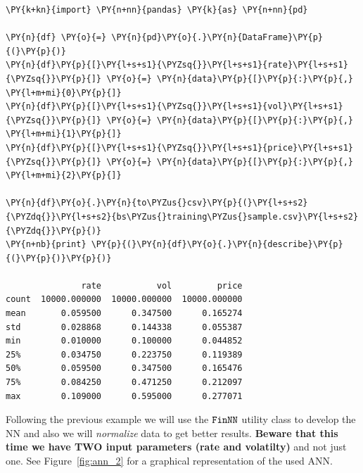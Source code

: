 \begin{tcolorbox}[breakable, size=fbox, boxrule=1pt, pad at break*=1mm,colback=cellbackground, colframe=cellborder]
\begin{Verbatim}[commandchars=\\\{\}]
\PY{k+kn}{import} \PY{n+nn}{pandas} \PY{k}{as} \PY{n+nn}{pd}
	
\PY{n}{df} \PY{o}{=} \PY{n}{pd}\PY{o}{.}\PY{n}{DataFrame}\PY{p}{(}\PY{p}{)}
\PY{n}{df}\PY{p}{[}\PY{l+s+s1}{\PYZsq{}}\PY{l+s+s1}{rate}\PY{l+s+s1}{\PYZsq{}}\PY{p}{]} \PY{o}{=} \PY{n}{data}\PY{p}{[}\PY{p}{:}\PY{p}{,} \PY{l+m+mi}{0}\PY{p}{]}
\PY{n}{df}\PY{p}{[}\PY{l+s+s1}{\PYZsq{}}\PY{l+s+s1}{vol}\PY{l+s+s1}{\PYZsq{}}\PY{p}{]} \PY{o}{=} \PY{n}{data}\PY{p}{[}\PY{p}{:}\PY{p}{,} \PY{l+m+mi}{1}\PY{p}{]}
\PY{n}{df}\PY{p}{[}\PY{l+s+s1}{\PYZsq{}}\PY{l+s+s1}{price}\PY{l+s+s1}{\PYZsq{}}\PY{p}{]} \PY{o}{=} \PY{n}{data}\PY{p}{[}\PY{p}{:}\PY{p}{,} \PY{l+m+mi}{2}\PY{p}{]}
	
\PY{n}{df}\PY{o}{.}\PY{n}{to\PYZus{}csv}\PY{p}{(}\PY{l+s+s2}{\PYZdq{}}\PY{l+s+s2}{bs\PYZus{}training\PYZus{}sample.csv}\PY{l+s+s2}{\PYZdq{}}\PY{p}{)}
\PY{n+nb}{print} \PY{p}{(}\PY{n}{df}\PY{o}{.}\PY{n}{describe}\PY{p}{(}\PY{p}{)}\PY{p}{)}

               rate           vol         price
count  10000.000000  10000.000000  10000.000000
mean       0.059500      0.347500      0.165274
std        0.028868      0.144338      0.055387
min        0.010000      0.100000      0.044852
25%        0.034750      0.223750      0.119389
50%        0.059500      0.347500      0.165476
75%        0.084250      0.471250      0.212097
max        0.109000      0.595000      0.277071
\end{Verbatim}
\end{tcolorbox}

Following the previous example we will use the \(\tt{FinNN}\) utility
class to develop the NN and also we will \emph{normalize} data to get
better results. \textbf{Beware that this time we have TWO input
  parameters (rate and volatilty)} and not just one. See Figure~\ref{fig:ann_2} for
a graphical representation of the used ANN.

